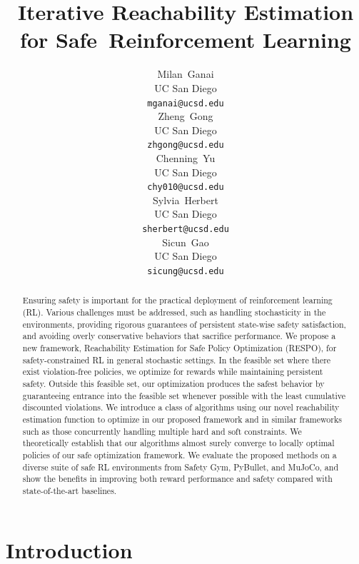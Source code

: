 \documentclass{article}
\title{Iterative Reachability Estimation for Safe~Reinforcement Learning}
\author{
  Milan~Ganai\\
  UC San Diego\\
  \texttt{mganai@ucsd.edu} \\
   \And
  Zheng~Gong\\
  UC San Diego\\
  \texttt{zhgong@ucsd.edu} \\
  \And
  Chenning~Yu\\
  UC San Diego\\
  \texttt{chy010@ucsd.edu} \\
  \AND
  Sylvia~Herbert\\
  UC San Diego\\
  \texttt{sherbert@ucsd.edu} \\
 \And
  Sicun~Gao\\
  UC San Diego\\
  \texttt{sicung@ucsd.edu} \\
  
  
  
  
  
}
\theoremstyle{definition}
\begin{document}
\maketitle

\begin{abstract}
    Ensuring safety is important for the practical deployment of reinforcement learning (RL). Various challenges must be addressed, such as handling stochasticity in the environments, providing rigorous guarantees of persistent state-wise safety satisfaction, and avoiding overly conservative behaviors that sacrifice performance. We propose a new framework, Reachability Estimation for Safe Policy Optimization (RESPO), for safety-constrained RL in general stochastic settings. In the feasible set where there exist violation-free policies, we optimize for rewards while maintaining persistent safety. Outside this feasible set, our optimization produces the safest behavior by guaranteeing entrance into the feasible set whenever possible with the least cumulative discounted violations. We introduce a class of algorithms using our novel reachability estimation function to optimize in our proposed framework and in similar frameworks such as those concurrently handling multiple hard and soft constraints. We theoretically establish that our algorithms almost surely converge to locally optimal policies of our safe optimization framework. We evaluate the proposed methods on a diverse suite of safe RL environments from Safety Gym, PyBullet, and MuJoCo, and show the benefits in improving both reward performance and safety compared with state-of-the-art baselines.
     
    
    
    

\end{abstract}

\section{Introduction}

\label{section:Intro}
\end{document}

